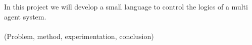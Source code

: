 In this project we will develop a small language to control the logics of a multi agent system.\\
\\
(Problem, method, experimentation, conclusion)
